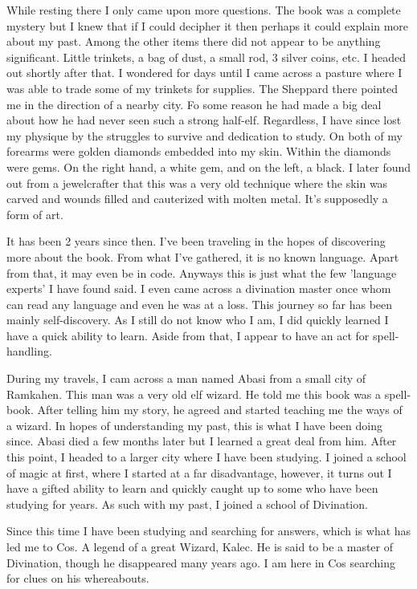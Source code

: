 \documentclass[11pt]{article}
\begin{document}
While resting there I only came upon more questions. The book was a complete mystery but I knew that if I could decipher it then perhaps it could explain more about my past. Among the other items there did not appear to be anything significant. Little trinkets, a bag of dust, a small rod, 3 silver coins, etc. I headed out shortly after that. I wondered for days until I came across a pasture where I was able to trade some of my trinkets for supplies. The Sheppard there pointed me in the direction of a nearby city. Fo some reason he had made a big deal about how he had never seen such a strong half-elf. Regardless, I have since lost my physique by the struggles to survive and dedication to study. On both of my forearms were golden diamonds embedded into my skin. Within the diamonds were gems. On the right hand, a white gem, and on the left, a black. I later found out from a jewelcrafter that this was a very old technique where the skin was carved and wounds filled and cauterized with molten metal. It's supposedly a form of art.

It has been 2 years since then. I've been traveling in the hopes of discovering more about the book. From what I've gathered, it is no known language. Apart from that, it may even be in code. Anyways this is just what the few 'language experts' I have found said. I even came across a divination master once whom can read any language and even he was at a loss. This journey so far has been mainly self-discovery. As I still do not know who I am, I did quickly learned I have a quick ability to learn. Aside from that, I appear to have an act for spell-handling.

During my travels, I cam across a man named Abasi from a small city of Ramkahen. This man was a very old elf wizard. He told me this book was a spell-book. After telling him my story, he agreed and started teaching me the ways of a wizard. In hopes of understanding my past, this is what I have been doing since. Abasi died a few months later but I learned a great deal from him. After this point, I headed to a larger city where I have been studying. I joined a school of magic at first, where I started at a far disadvantage, however, it turns out I have a gifted ability to learn and quickly caught up to some who have been studying for years. As such with my past, I joined a school of Divination.

Since this time I have been studying and searching for answers, which is what has led me to Cos. A legend of a great Wizard, Kalec. He is said to be a master of Divination, though he disappeared many years ago. I am here in Cos searching for clues on his whereabouts.
\end{document}
